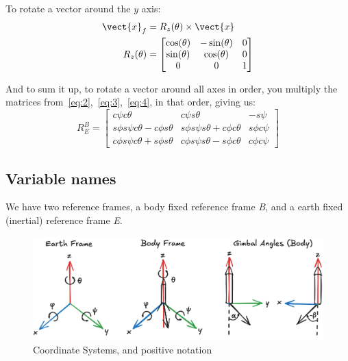 \documentclass{report}
\begin{document}
To rotate a vector around the ${y}$ axis:
\begin{equation} \label{eq:4}
\begin{split}
\vect{x}_f &= R_z(\theta) \times \vect{x} \\
R_z(\theta) &= \begin{bmatrix}
\cos(\theta) & -\sin(\theta) & 0 \\
\sin(\theta) & \cos(\theta) & 0 \\
0 & 0 & 1
\end{bmatrix}
\end{split}
\end{equation}




And to sum it up, to rotate a vector around all axes in order, you multiply the matrices from{~}\ref{eq:2},{~}\ref{eq:3},{~}\ref{eq:4}, in that order, giving us:
\begin{equation} \label{eq:5}
    R^B_E = \begin{bmatrix}
        c\psi c\theta & c\psi s\theta  & -s\psi \\ 
        s\phi s\psi c\theta - c\phi s\theta & s\phi s\psi s\theta + c\phi c\theta & s\phi c\psi \\
        c\phi s\psi c\theta + s\phi s\theta & c\phi s\psi s\theta - s\phi c\theta & c\phi c\psi
    \end{bmatrix}
\end{equation}


\subsection{Variable names}
 We have two reference frames, a body fixed reference frame \textit{B}, and a earth fixed (inertial) reference frame \textit{E}. 

\begin{figure}[H]
\caption{Coordinate Systems, and positive notation}
\includegraphics[width=\textwidth]{notation}
\centering
\end{figure}
\end{document}
